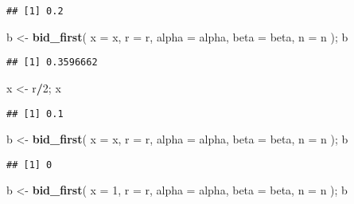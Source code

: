 \documentclass[
]{book}
\newenvironment{Shaded}{\begin{snugshade}}{\end{snugshade}}
\newcommand{\AttributeTok}[1]{\textcolor[rgb]{0.13,0.29,0.53}{#1}}
\newcommand{\DecValTok}[1]{\textcolor[rgb]{0.00,0.00,0.81}{#1}}
\newcommand{\FunctionTok}[1]{\textcolor[rgb]{0.13,0.29,0.53}{\textbf{#1}}}
\newcommand{\NormalTok}[1]{#1}
\newcommand{\OtherTok}[1]{\textcolor[rgb]{0.56,0.35,0.01}{#1}}
\newcommand{\SpecialCharTok}[1]{\textcolor[rgb]{0.81,0.36,0.00}{\textbf{#1}}}
\begin{document}
\begin{verbatim}
## [1] 0.2
\end{verbatim}

\begin{Shaded}
\begin{Highlighting}[]
\NormalTok{b }\OtherTok{\textless{}{-}} 
  \FunctionTok{bid\_first}\NormalTok{(}
    \AttributeTok{x =}\NormalTok{ x,}
    \AttributeTok{r =}\NormalTok{ r,}
    \AttributeTok{alpha =}\NormalTok{ alpha,}
    \AttributeTok{beta =}\NormalTok{ beta,}
    \AttributeTok{n =}\NormalTok{ n}
\NormalTok{    );}
\NormalTok{b}
\end{Highlighting}
\end{Shaded}

\begin{verbatim}
## [1] 0.3596662
\end{verbatim}

\begin{Shaded}
\begin{Highlighting}[]
\NormalTok{x }\OtherTok{\textless{}{-}}\NormalTok{ r}\SpecialCharTok{/}\DecValTok{2}\NormalTok{;}
\NormalTok{x}
\end{Highlighting}
\end{Shaded}

\begin{verbatim}
## [1] 0.1
\end{verbatim}

\begin{Shaded}
\begin{Highlighting}[]
\NormalTok{b }\OtherTok{\textless{}{-}} 
  \FunctionTok{bid\_first}\NormalTok{(}
    \AttributeTok{x =}\NormalTok{ x,}
    \AttributeTok{r =}\NormalTok{ r, }
    \AttributeTok{alpha =}\NormalTok{ alpha,}
    \AttributeTok{beta =}\NormalTok{ beta, }
    \AttributeTok{n =}\NormalTok{ n}
\NormalTok{    ); }
\NormalTok{b}
\end{Highlighting}
\end{Shaded}

\begin{verbatim}
## [1] 0
\end{verbatim}

\begin{Shaded}
\begin{Highlighting}[]
\NormalTok{b }\OtherTok{\textless{}{-}} 
  \FunctionTok{bid\_first}\NormalTok{(}
    \AttributeTok{x =} \DecValTok{1}\NormalTok{, }
    \AttributeTok{r =}\NormalTok{ r, }
    \AttributeTok{alpha =}\NormalTok{ alpha, }
    \AttributeTok{beta =}\NormalTok{ beta, }
    \AttributeTok{n =}\NormalTok{ n}
\NormalTok{    ); }
\NormalTok{b}
\end{Highlighting}
\end{Shaded}
\end{document}
